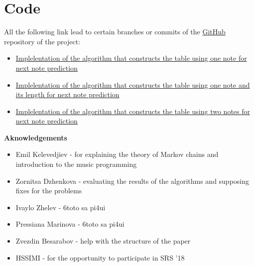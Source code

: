 \documentclass[]{article}
\begin{document}
    \section{Code}
        All the following link lead to certain branches or commits of the \href{https://github.com}{GitHub} repository of the project:
        \begin{itemize}
            \item \href{https://github.com/Ro6afF/compmus/tree/0cf9173a547a9effdc720dc6f6ac8ad551cd2fa4}{Implelentation of the algorithm that constructs the table using one note for next note prediction}
            \item \href{https://github.com/Ro6afF/compmus/tree/One_note_with_time}{Implelentation of the algorithm that constructs the table using one note and its length for next note prediction}
            \item \href{https://github.com/Ro6afF/compmus/tree/72fbc777ef7371ac7810d87d306ba3a2e8267121}{Implelentation of the algorithm that constructs the table using two notes for next note prediction}
        \end{itemize}
        \newpage
    {}
    
    {\large{\textbf{Aknowledgements}}}
    \begin{itemize}
        \item Emil Kelevedjiev - for explaining the theory of Markov chains and introduction to the music programming
        \item Zornitsa Dzhenkova - evaluating the results of the algorithms and supposing fixes for the problems
        \item Ivaylo Zhelev - 6toto sa pi4ui
        \item Pressiana Marinova - 6toto sa pi4ui
        \item Zvezdin Besarabov - help with the structure of the paper
        \item HSSIMI - for the opportunity to participate in SRS '18

    \end{itemize}
\end{document}

